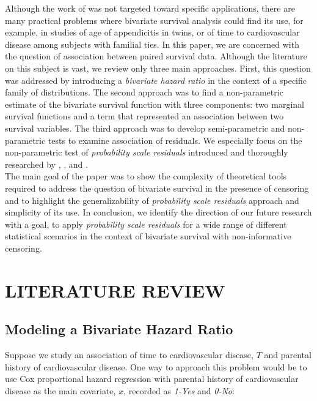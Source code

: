 \documentclass[]{article}
\begin{document}
Although the work of \cite{basu1971bivariate} was not targeted toward specific applications, there are many practical problems where bivariate survival analysis could find its use, for example, in studies of age of appendicitis in twins, or of time to cardiovascular disease among subjects with familial ties. In this paper, we are concerned with the question of association between paired survival data. Although the literature on this subject is vast, we review only three main approaches. First, this question was addressed by introducing a \emph{bivariate hazard ratio} in the context of a specific family of distributions. The second approach was to find a non-parametric estimate of the bivariate survival function with three components: two marginal survival functions and a term that represented an association between two survival variables. The third approach was to develop semi-parametric and non-parametric tests to examine association of residuals. We especially focus on the non-parametric test of \emph{probability scale residuals} introduced and thoroughly researched by \cite{li2012new}, \cite{liu2016covariate}, and \cite{shepherd2016probability}.\\
The main goal of the paper was to show the complexity of theoretical tools required to address the question of bivariate survival in the presence of censoring and to highlight the generalizability of \emph{probability scale residuals} approach and simplicity of its use. In conclusion, we identify the direction of our future research with a goal, to apply \emph{probability scale residuals} for a wide range of different statistical scenarios in the context of bivariate survival with non-informative censoring.

\section{LITERATURE REVIEW}

\subsection{Modeling a Bivariate Hazard Ratio}

Suppose we study an association of time to cardiovascular disease, $T$ and parental history of cardiovascular disease. One way to approach this problem would be to use Cox proportional hazard regression with parental history of cardiovascular disease as the main covariate, $x$, recorded as \emph{1-Yes} and \emph{0-No}:
\end{document}

